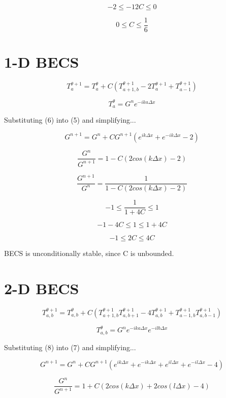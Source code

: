 \documentclass[a4paper,12pt]{article}
\begin{document}
\[
-2 \leq - 12C \leq 0
\]

\[
0 \leq C \leq \frac{1}{6}
\]

\pagebreak
\section{1-D BECS}

\begin{equation}
T_{a}^{\theta+1} = T_{a}^{\theta} + C \left(T_{a+1,b}^{\theta+1}
- 2T_{a}^{\theta+1}
+ T_{a-1}^{\theta+1}
\right)
\end{equation}

\begin{equation}
T_{a}^{\theta} = G^n e^{-ika\Delta x}
\end{equation}

Substituting (6) into (5) and simplifying...

\[
G^{n+1} = G^n + C G^{n+1}
\left(
e^{ik\Delta x} + e^{-ik\Delta x}
- 2
\right)
\]

\[
\frac{G^n}{G^{n+1}} = 1 - C
\left(
2cos(k \Delta x) -  2
\right)
\]

\[
\frac{G^{n+1}}{G^n} = \frac{1}{1 - C
\left(
2cos(k \Delta x) -  2
\right)}
\]

\[
-1 \leq \frac{1}{1 + 4C} \leq 1
\]

\[
-1-4C \leq 1 \leq 1+4C
\]

\[
-1 \leq 2C \leq 4C
\]

BECS is unconditionally stable, since C is unbounded.

\pagebreak
\section{2-D BECS}

\begin{equation}
T_{a,b}^{\theta+1} = T_{a,b}^{\theta} + C \left(
T_{a+1,b}^{\theta+1}
T_{a,b+1}^{\theta+1}
- 4T_{a,b}^{\theta+1}
+ T_{a-1,b}^{\theta+1}
T_{a,b-1}^{\theta+1}
\right)
\end{equation}

\begin{equation}
T_{a,b}^{\theta} = G^n e^{-ika\Delta x} e^{-ilb\Delta x}
\end{equation}

Substituting (8) into (7) and simplifying...

\[
G^{n+1} = G^n + C G^{n+1}
\left(
e^{ik\Delta x} + e^{-ik\Delta x}
+ e^{il\Delta x} + e^{-il\Delta x}
- 4
\right)
\]

\[
\frac{G^n}{G^{n+1}} = 1 + C
\left(
2cos(k \Delta x) + 2cos(l \Delta x) -  4
\right)
\]
\end{document}

